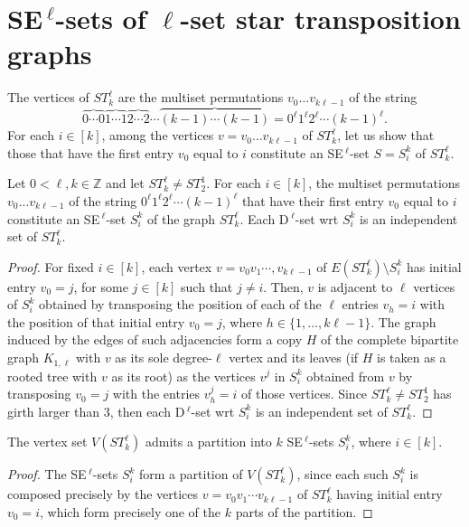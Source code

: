 \documentclass[12pt,reqno]{article}
\begin{document}
\section{SE$\,^\ell$-sets of $\ell$-set star transposition graphs}%
\label{Galphak}

The vertices of $ST^\ell_k$ are the multiset permutations $v_0\dots v_{k\ell -1}$ of the string $$\overbrace{0\cdots 0}\overbrace{1\cdots 1}\overbrace{2\cdots 2}\cdots\overbrace{(k-1)\cdots(k-1)}=0^\ell  1^\ell 2^\ell \cdots(k-1)^\ell .$$         
For each $i\in[k]$, among the vertices $v=v_0\dots v_{k\ell -1}$ of $ST^\ell_k$, let us show that those that have the first entry $v_0$ equal to $i$ constitute an SE$\,^\ell$-set $S=S_i^k$ of $ST^\ell_k$.   

\begin{theorem}\label{teo1}\label{t} Let $0<\ell ,k\in\mathbb{Z}$ and let $ST^\ell_k\ne ST^1_2$.
For each $i\in[k]$, the multiset permutations $v_0\dots v_{k\ell -1}$ of the string 
$0^\ell  1^\ell 2^\ell \cdots(k-1)^\ell$ that have their first entry $v_0$ equal to $i$ constitute 
an SE$\,^\ell$-set $S_i^k$ of the graph $ST^\ell_k$. Each D$\,^\ell$-set wrt $S_i^k$ is an independent set of $ST^\ell_k$. 
\end{theorem}

\begin{proof}
For fixed $i\in[k]$, each vertex $v=v_0v_1\cdots,v_{k\ell -1}$ of $E(ST^\ell_k)\setminus S_i^k$ has initial entry $v_0=j$, for some $j\in[k]$ such that $j\ne i$. Then, $v$ is adjacent to $\ell$ vertices of $S_i^k$ obtained by transposing the position of each of the $\ell$ entries $v_h=i$ with the position of that initial entry $v_0=j$, where $h\in\{1,\ldots,k\ell -1\}$. The graph induced by the edges of such adjacencies form a copy $H$ of the complete bipartite graph $K_{1,\ell }$ with $v$ as its sole degree-$\ell$ vertex and its leaves (if $H$ is taken as a rooted tree with $v$ as its root) as the vertices $v^j$ in $S_i^k$
obtained from $v$ by transposing $v_0=j$ with the entries $v_h^j=i$ of those vertices. Since $ST^\ell_k\ne ST^1_2$ has girth larger than 3, then each D$\,^\ell$-set wrt $S_i^k$ is an independent set of $ST^\ell_k$. 
\end{proof}

\begin{corollary}
 The vertex set $V(ST^\ell_k)$ admits a partition into $k$ SE$\,^\ell$-sets $S_i^k$, where $i\in[k]$. 
\end{corollary}

\begin{proof} The SE$\,^\ell$-sets $S_i^k$ form a partition of $V(ST^\ell_k)$, since each such $S_i^k$ is composed precisely by the vertices $v=v_0v_1\cdots v_{k\ell -1}$ of $ST^\ell_k$ having initial entry $v_0=i$, which form precisely one of the $k$ parts of the partition.
\end{proof}
\end{document}
